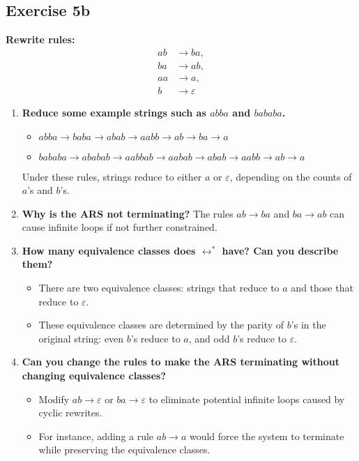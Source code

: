 \documentclass{article}
\theoremstyle{theorem}
\theoremstyle{definition}
\theoremstyle{remark}
\begin{document}
\subsection*{Exercise 5b}
\textbf{Rewrite rules:}
\[
\begin{aligned}
    ab &\to ba, \\
    ba &\to ab, \\
    aa &\to a, \\
    b &\to \varepsilon
\end{aligned}
\]
\begin{enumerate}
    \item \textbf{Reduce some example strings such as \( abba \) and \( bababa \).}
        \begin{itemize}
            \item \( abba \to baba \to abab \to aabb \to ab \to ba \to a \)
            \item \( bababa \to ababab \to aabbab \to aabab \to abab \to aabb \to ab \to a \)
        \end{itemize}
        Under these rules, strings reduce to either \( a \) or \( \varepsilon \), depending on the counts of \( a \)'s and \( b \)'s.

    \item \textbf{Why is the ARS not terminating?} The rules \( ab \to ba \) and \( ba \to ab \) can cause infinite loops if not further constrained.

    \item \textbf{How many equivalence classes does \( \leftrightarrow^\ast \) have? Can you describe them?}
        \begin{itemize}
            \item There are two equivalence classes: strings that reduce to \( a \) and those that reduce to \( \varepsilon \).
            \item These equivalence classes are determined by the parity of \( b \)'s in the original string: even \( b \)'s reduce to \( a \), and odd \( b \)'s reduce to \( \varepsilon \).
        \end{itemize}

    \item \textbf{Can you change the rules to make the ARS terminating without changing equivalence classes?}
        \begin{itemize}
            \item Modify \( ab \to \varepsilon \) or \( ba \to \varepsilon \) to eliminate potential infinite loops caused by cyclic rewrites.
            \item For instance, adding a rule \( ab \to a \) would force the system to terminate while preserving the equivalence classes.
        \end{itemize}


\end{enumerate}
\end{document}

